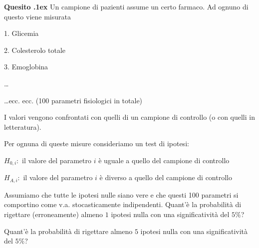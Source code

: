 \documentclass[11pt,twoside,a4paper]{article}
\newcounter{quesito}
\newenvironment{question}{\addtocounter{quesito}{1}\par\textbf{Quesito \thequesito.\kern1ex}}{\vspace{0.5\parskip}}
\begin{document}
\begin{question}
Un campione di pazienti assume un certo farmaco. Ad ognuno di questo viene misurata

1. Glicemia

2. Colesterolo totale

3. Emoglobina

\ldots

\ldots ecc. ecc. (100 parametri fisiologici in totale)

I valori vengono confrontati con quelli di un campione di controllo (o con quelli in letteratura).

Per ognuna di queste misure consideriamo un test di ipotesi:

$H_{0,i}:$ il valore del parametro $i$ è uguale a quello del campione di controllo

$H_{A,i}:$ il valore del parametro $i$ è diverso a quello del campione di controllo

Assumiamo che tutte le ipotesi nulle siano vere e che questi 100 parametri si comportino come v.a. stocasticamente indipendenti. Quant'è la probabilità di rigettare (erroneamente) almeno $1$ ipotesi nulla con una significatività del $5\%$?

Quant'è la probabilità di rigettare almeno $5$ ipotesi nulla con una significatività del $5\%$?
\end{question}
\end{document}
